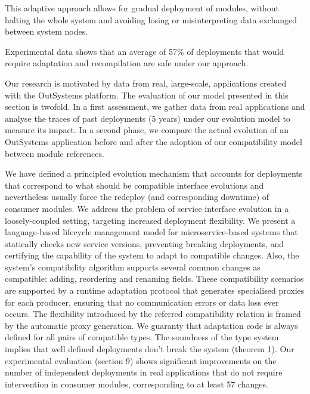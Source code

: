 This adaptive approach allows for gradual deployment of modules, without halting the whole system and avoiding losing or misinterpreting
data exchanged between system nodes.

Experimental data shows that an average of 57\% of deployments that would require adaptation and recompilation are safe under our approach.


Our research is motivated by data from real, large-scale, applications created with
the OutSystems platform. The evaluation of our model presented in this section is
twofold. In a first assessment, we gather data from real applications and analyse the
traces of past deployments (5 years) under our evolution model to measure its impact.
In a second phase, we compare the actual evolution of an OutSystems application
before and after the adoption of our compatibility model between module references.

We have defined a principled evolution mechanism that accounts for deployments
that correspond to what should be compatible interface evolutions and nevertheless
usually force the redeploy (and corresponding downtime) of consumer modules.
We address the problem of service interface evolution in a loosely-coupled setting,
targeting increased deployment flexibility. We present a language-based lifecycle
management model for microservice-based systems that statically checks new service
versions, preventing breaking deployments, and certifying the capability of the system
to adapt to compatible changes. Also, the system’s compatibility algorithm supports
several common changes as compatible: adding, reordering and renaming fields.
These compatibility scenarios are supported by a runtime adaptation protocol that
generates specialised proxies for each producer, ensuring that no communication
errors or data loss ever occurs. The flexibility introduced by the referred compatibility
relation is framed by the automatic proxy generation. We guaranty that adaptation
code is always defined for all pairs of compatible types. The soundness of the type
system implies that well defined deployments don’t break the system (theorem 1). Our
experimental evaluation (section 9) shows significant improvements on the number
of independent deployments in real applications that do not require intervention in
consumer modules, corresponding to at least 57 %
changes.